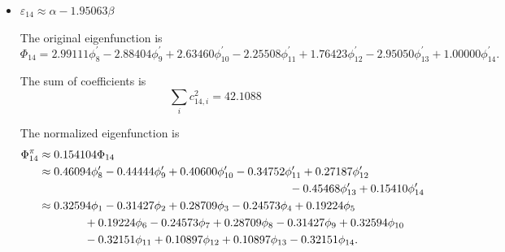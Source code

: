 \documentclass[a4paper]{book}
\begin{document}
\begin{solution}
\begin{enumerate}[label=(\alph*)]
\begin{itemize}
		
		\item $\varepsilon_{14} \approx \alpha - 1.95063 \beta$
		
		The original eigenfunction is
		\begin{equation*}
			\Phi_{14} =  2.99111 \phi^\prime_8 -2.88404 \phi^\prime_9 + 2.63460 \phi^\prime_{10} -2.25508 \phi^\prime_{11}   + 1.76423 \phi^\prime_{12} - 2.95050  \phi^\prime_{13} + 1.00000 \phi^\prime_{14}.
		\end{equation*}
		
		The sum of coefficients is
		\begin{equation*}
			\sum_{i} c^2_{14,i} = 42.1088
		\end{equation*}
		
		The normalized eigenfunction is		
		\begin{align}
			\Phi^\pi_{14} &\approx 0.154104 \Phi_{14} \notag \\
			&\approx 0.46094 \phi^\prime_8 -0.44444 \phi^\prime_9  + 0.40600 \phi^\prime_{10} -0.34752 \phi^\prime_{11} + 0.27187 \phi^\prime_{12}  \notag\\
			&\hspace*{22em} -0.45468 \phi^\prime_{13} + 0.15410 \phi^\prime_{14} \notag \\
			&\approx 0.32594 \phi_1 -0.31427 \phi_2  + 0.28709 \phi_3 -0.24573 \phi_4 +0.19224 \phi_5  \notag \\
			&\hspace*{4em}  +0.19224 \phi_6  -0.24573 \phi_7 + 0.28709 \phi_8  -0.31427 \phi_9   + 0.32594 \phi_{10} \notag \\
			&\hspace*{4em} -0.32151 \phi_{11} + 0.10897 \phi_{12}  + 0.10897 \phi_{13} -0.32151 \phi_{14} .
		\end{align}
		
		\end{itemize}
		

\end{enumerate}
\end{solution}
\end{document}

